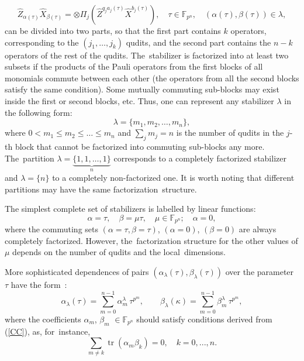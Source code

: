 \documentclass[quantumrep,article,accept,pdftex,moreauthors]{Definitions/mdpi}
\DeclareMathOperator{\tr}{tr}
\begin{document}
\begin{equation*}
  \hat{Z}_{\alpha(\tau)}\hat{X}_{\beta(\tau)}
  = \otimes \Pi_{j} \left(
    \hat{Z}^{q_{j}a_{j}(\tau)}\hat{X}^{b_{j}(\tau)}
  \right),
  \quad \tau \in \mathbb{F}_{p^{n}},
  \quad \left(\alpha(\tau),\beta(\tau)\right) \in \lambda,
\end{equation*}
can be divided into two parts, so that the first part contains $k$ operators,
corresponding to the $(j_{1},\ldots,j_{k})$ qudits, and the second part contains
the $n-k$ operators of the rest of the qudits. The~stabilizer is factorized into
at least two subsets if the products of the Pauli operators from the first blocks of all monomials commute between each other (the operators from all the second
blocks satisfy the same condition).  Some mutually commuting sub-blocks may
exist inside the first or second blocks, etc. Thus, one can represent any
stabilizer $\lambda$ in the following form:
\begin{equation}
  \lambda = \{m_{1},m_{2},\ldots,m_{n}\},
  \label{curve_part}
\end{equation}
where $0<m_{1}\leq m_{2} \leq \ldots \leq m_{n}$ and $\sum_{j}m_{j}=n$ is the
number of qudits in the $j$-th block that cannot be factorized into commuting
sub-blocks any more. The~partition $\lambda =\underbrace{\{1,1,\ldots ,1\}}_{n}$
corresponds to a completely factorized stabilizer and $\lambda=\{n\}$ to a
completely non-factorized one. It is worth noting that different partitions may
have the same factorization~structure.

The simplest complete set of stabilizers is labelled by linear functions:
\begin{equation}
  \alpha = \tau, \quad \beta = \mu \tau, \quad \mu \in \mathbb{F}_{p^{n}};
  \quad \alpha = 0,
  \label{rays}
\end{equation}
where the commuting sets $\left(\alpha = \tau, \beta = \tau \right)$,
$\left(\alpha = 0\right)$, $\left(\beta = 0\right)$ are always completely
factorized.  However, the~factorization structure for the other values of $\mu$
depends on the number of qudits and the local~dimensions.

More sophisticated dependences of pairs
$\left(\alpha_{\lambda}(\tau),\beta_{\lambda }(\tau)\right)$ over the parameter
$\tau$ have the form~\cite{GS2,JPA09}:
\begin{equation}
  \alpha_{\lambda }(\tau)
  = \sum_{m=0}^{n-1} \alpha_{m}^{\lambda } \, \tau^{p^{m}},
  \qquad \beta_{\lambda}(\kappa)
  = \sum_{m=0}^{n-1}\beta_{m}^{\lambda} \, \tau^{p^{m}},
  \label{curve1}
\end{equation}
where the coefficients $\alpha_{m}$, $\beta_{m}$ $\in \mathbb{F}_{p^{n}}$
should satisfy conditions derived from (\ref{CC}), as, \mbox{for instance},
\begin{equation*}
  \sum_{m \neq k} \tr(\alpha_{m}\beta_{k}) = 0, \quad k = 0,...,n.
\end{equation*}
\end{document}
